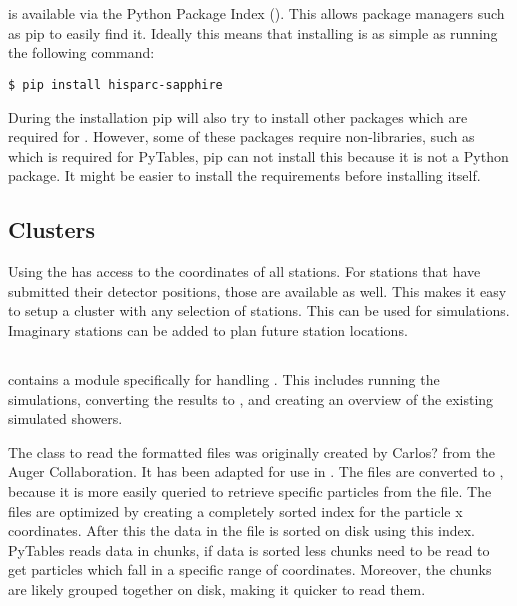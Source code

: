 \section{\sapphire}

\subsection{\pypi}

\sapphire is available via the Python Package Index (\pypi). This allows
package managers such as pip to easily find it. Ideally this means that installing \sapphire is as simple as running the following command:

\begin{verbatim}
$ pip install hisparc-sapphire
\end{verbatim}

During the installation pip will also try to install other packages which are required for \sapphire. However, some of these packages require non-\python libraries, such as \hdf which is required for PyTables, pip can not install this because it is not a Python package. It might be easier to install the requirements before installing \sapphire itself.


\subsection{Clusters}

Using the \api \sapphire has access to the \gps coordinates of all stations. For stations that have submitted their detector positions, those are available as well. This makes it easy to setup a cluster with any selection of \hisparc stations. This can be used for simulations. Imaginary stations can be added to plan future station locations.


\subsection{\corsika}

\sapphire contains a module specifically for handling \corsika. This includes running the \corsika simulations, converting the results to \hdf, and creating an overview of the existing \corsika simulated showers.

The class to read the \corsika \fortran formatted files was originally created by Carlos? from the Auger Collaboration. It has been adapted for use in \hisparc. The files are converted to \hdf, because it is more easily queried to retrieve specific particles from the file. The \hdf files are optimized by creating a completely sorted index for the particle x coordinates. After this the data in the file is sorted on disk using this index. PyTables reads data in chunks, if data is sorted less chunks need to be read to get particles which fall in a specific range of coordinates. Moreover, the chunks are likely grouped together on disk, making it quicker to read them.


